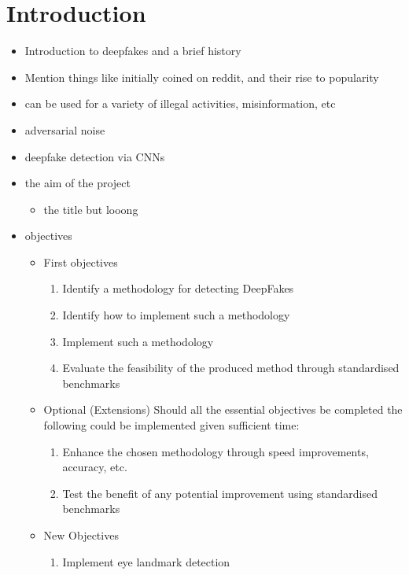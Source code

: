 \chapter{Introduction}
\label{ch:introduction}

\begin{itemize}
    \item Introduction to deepfakes and a brief history
    \item Mention things like initially coined on reddit, and their rise to popularity
    \item can be used for a variety of illegal activities, misinformation, etc
    \item adversarial noise
    \item deepfake detection via CNNs
    \item the aim of the project
    \begin{itemize}
        \item the title but looong
    \end{itemize}
    \item objectives
    \begin{itemize}
        \item First objectives
        \begin{enumerate}
            \item Identify a methodology for detecting DeepFakes
            \item Identify how to implement such a methodology
            \item Implement such a methodology
            \item Evaluate the feasibility of the produced method through standardised benchmarks
        \end{enumerate}
        \item{Optional (Extensions)}
        Should all the essential objectives be completed the following could be implemented given sufficient time:
        \begin{enumerate}
            \item Enhance the chosen methodology through speed improvements, accuracy, etc.
            \item Test the benefit of any potential improvement using standardised benchmarks
        \end{enumerate}
        \item New Objectives
        \begin{enumerate}
            \item Implement eye landmark detection

\end{enumerate}
\end{itemize}
\end{itemize}
